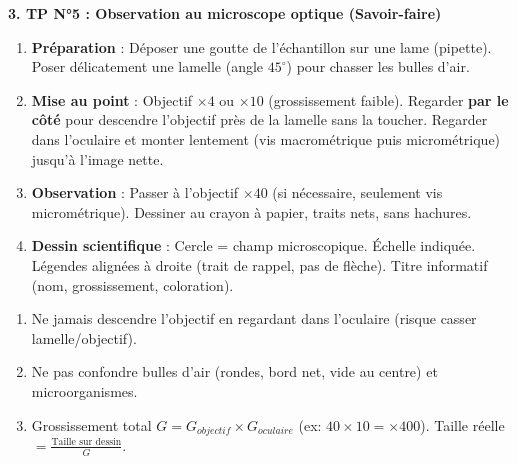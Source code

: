 \documentclass[11pt]{article}
\begin{document}
\begin{bilan}
\textbf{3. TP N°5 : Observation au microscope optique (Savoir-faire)}
\begin{methode}
\begin{enumerate}
    \item \textbf{Préparation} : Déposer une goutte de l'échantillon sur une lame (pipette). Poser délicatement une lamelle (angle $45^\circ$) pour chasser les bulles d'air.
    \item \textbf{Mise au point} : Objectif $\times 4$ ou $\times 10$ (grossissement faible). Regarder \textbf{par le côté} pour descendre l'objectif près de la lamelle sans la toucher. Regarder dans l'oculaire et monter lentement (vis macrométrique puis micrométrique) jusqu'à l'image nette.
    \item \textbf{Observation} : Passer à l'objectif $\times 40$ (si nécessaire, seulement vis micrométrique). Dessiner au crayon à papier, traits nets, sans hachures.
    \item \textbf{Dessin scientifique} : Cercle = champ microscopique. Échelle indiquée. Légendes alignées à droite (trait de rappel, pas de flèche). Titre informatif (nom, grossissement, coloration).
\end{enumerate}
\end{methode}
\begin{attention}
\begin{enumerate}
\item Ne jamais descendre l'objectif en regardant dans l'oculaire (risque casser lamelle/objectif).
\item Ne pas confondre bulles d'air (rondes, bord net, vide au centre) et microorganismes.
\item Grossissement total $G = G_{objectif} \times G_{oculaire}$ (ex: $40 \times 10 = \times 400$). Taille réelle $= \frac{\text{Taille sur dessin}}{G}$.
\end{enumerate}
\end{attention}


\end{bilan}
\end{document}
